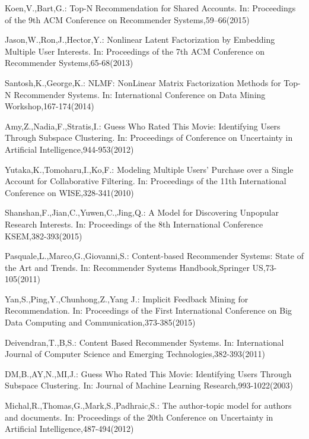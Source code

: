 \documentclass{llncs}
\begin{document}
\begin{thebibliography}{1}
Koen,V.,Bart,G.:
Top-N Recommendation for Shared Accounts.
In: Proceedings of the 9th ACM Conference on Recommender Systems,59–66(2015)

Jason,W.,Ron,J.,Hector,Y.:
Nonlinear Latent Factorization by Embedding Multiple User Interests.
In: Proceedings of the 7th ACM Conference on Recommender Systems,65-68(2013)

Santosh,K.,George,K.:
NLMF: NonLinear Matrix Factorization Methods for Top-N Recommender Systems.
In: International Conference on Data Mining Workshop,167-174(2014)

Amy,Z.,Nadia,F.,Stratis,I.:
Guess Who Rated This Movie: Identifying Users Through Subspace Clustering.
In: Proceedings of Conference on Uncertainty in Artificial Intelligence,944-953(2012)

Yutaka,K.,Tomoharu,I.,Ko,F.:
Modeling Multiple Users' Purchase over a Single Account for Collaborative Filtering.
In: Proceedings of the 11th International Conference on WISE,328-341(2010)

Shanshan,F.,Jian,C.,Yuwen,C.,Jing,Q.:
A Model for Discovering Unpopular Research Interests.
In: Proceedings of the 8th International Conference KSEM,382-393(2015)

Pasquale,L.,Marco,G.,Giovanni,S.:
Content-based Recommender Systems: State of the Art and Trends.
In: Recommender Systems Handbook,Springer US,73-105(2011)

Yan,S.,Ping,Y.,Chunhong,Z.,Yang J.:
Implicit Feedback Mining for Recommendation.
In: Proceedings of the First International Conference on Big Data Computing and Communication,373-385(2015)

Deivendran,T.,B,S.:
Content Based Recommender Systems.
In: International Journal of Computer Science and Emerging Technologies,382-393(2011)

DM,B.,AY,N.,MI,J.:
Guess Who Rated This Movie: Identifying Users Through Subspace Clustering.
In: Journal of Machine Learning Research,993-1022(2003)

Michal,R.,Thomas,G.,Mark,S.,Padhraic,S.:
The author-topic model for authors and documents.
In: Proceedings of the 20th Conference on Uncertainty in Artificial Intelligence,487-494(2012)


\end{thebibliography}
\end{document}
